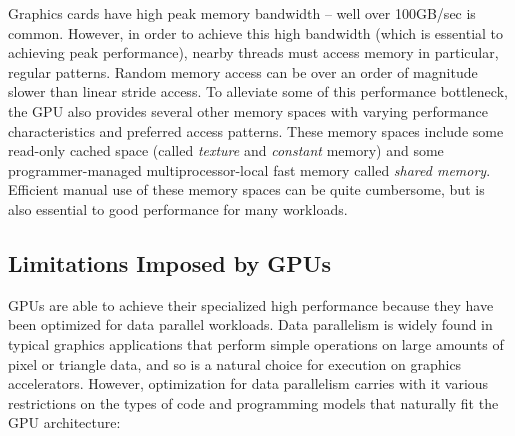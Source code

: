 \documentclass[preprint]{sigplanconf}
\begin{document}
Graphics cards have high peak memory bandwidth -- well over 100GB/sec is common.  However, in order to achieve this high bandwidth (which is essential to achieving peak performance), nearby threads must access memory in particular, regular patterns.  Random memory access can be over an order of magnitude slower than linear stride access.  To alleviate some of this performance bottleneck, the GPU also provides several other memory spaces with varying performance characteristics and preferred access patterns.  These memory spaces include some read-only cached space (called \emph{texture} and \emph{constant} memory) and some programmer-managed multiprocessor-local fast memory called \emph{shared memory}.  Efficient manual use of these memory spaces can be quite cumbersome, but is also essential to good performance for many workloads.

\subsection{Limitations Imposed by GPUs}
\label{GPULimitations}
GPUs are able to achieve their specialized high performance because they have been optimized for data parallel workloads. Data parallelism is widely found in typical graphics applications that perform simple operations on large amounts of pixel or triangle data, and so is a natural choice for execution on graphics accelerators.  However, optimization for data parallelism carries with it various restrictions on the types of code and programming models that naturally fit the GPU architecture:
\end{document}
